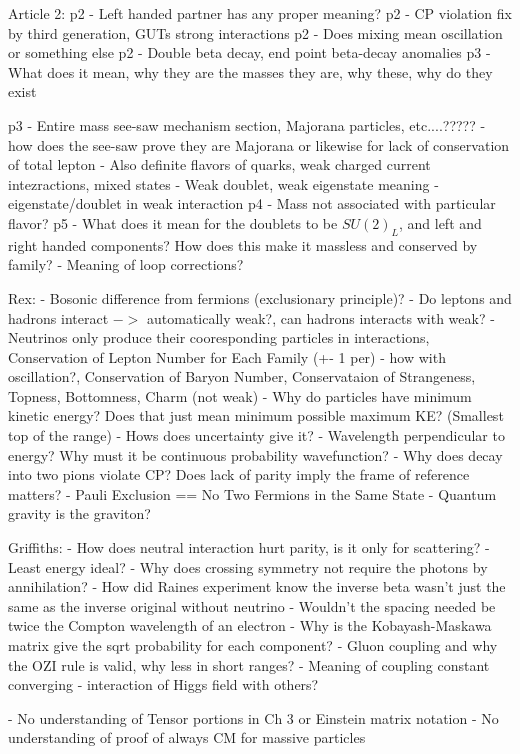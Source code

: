 \documentclass[11 pt, twoside]{article}
\begin{document}
Article 2:
p2 - Left handed partner has any proper meaning?
p2 - CP violation fix by third generation, GUTs strong interactions
p2 - Does mixing mean oscillation or something else
p2 - Double beta decay, end point beta-decay anomalies
p3 - What does it mean, why they are the masses they are, why these, why do they exist

p3 - Entire mass see-saw mechanism section, Majorana particles, etc....????? - how does the see-saw prove they are Majorana or likewise for lack of conservation of total lepton
- Also definite flavors of quarks, weak charged current intezractions, mixed states
- Weak doublet, weak eigenstate meaning - eigenstate/doublet in weak interaction
p4 - Mass not associated with particular flavor?
p5 - What does it mean for the doublets to be $SU(2)_L$, and left and right handed components? How does this make it massless and conserved by family?
- Meaning of loop corrections?

Rex:
- Bosonic difference from fermions (exclusionary principle)?
- Do leptons and hadrons interact $->$ automatically weak?, can hadrons interacts with weak?
- Neutrinos only produce their cooresponding particles in interactions, Conservation of Lepton Number for Each Family (+- 1 per) - how with oscillation?, Conservation of Baryon Number, Conservataion of Strangeness, Topness, Bottomness, Charm (not weak)
- Why do particles have minimum kinetic energy? Does that just mean minimum possible maximum KE? (Smallest top of the range) - Hows does uncertainty give it?
- Wavelength perpendicular to energy? Why must it be continuous probability wavefunction?
- Why does decay into two pions violate CP? Does lack of parity imply the frame of reference matters?
- Pauli Exclusion == No Two Fermions in the Same State
- Quantum gravity is the graviton?

Griffiths:
- How does neutral interaction hurt parity, is it only for scattering?
- Least energy ideal?
- Why does crossing symmetry not require the photons by annihilation?
- How did Raines experiment know the inverse beta wasn't just the same as the inverse original without neutrino
- Wouldn't the spacing needed be twice the Compton wavelength of an electron
- Why is the Kobayash-Maskawa matrix give the sqrt probability for each component?
- Gluon coupling and why the OZI rule is valid, why less in short ranges?
- Meaning of coupling constant converging - interaction of Higgs field with others?

- No understanding of Tensor portions in Ch 3 or Einstein matrix notation
- No understanding of proof of always CM for massive particles
\end{document}
